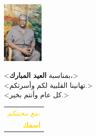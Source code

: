 \documentclass[a6paper, landscape]{article} %
\begin{document}
\thispagestyle{empty} %

\begin{center}
    \includegraphics[width=2cm]{profile.jpeg} \\ %
    \vspace{0.5cm}
    \textcolor{blue!70!black}{ %
        \begin{large}
            <بمناسبة \textbf{العيد المبارك}،> \\
            <تهانينا القلبية لكم وأسرتكم.> \\
            <كل عام وأنتم بخير.> \\
        \end{large}
    }
    \vspace{1cm}
    \textcolor{gold}{ %
        \begin{tabular}{r}
            \hline
            \scriptsize\textit{مع محبتكم،} \\
            \textbf{اسمك}
        \end{tabular}
    }
\end{center}
\end{document}
